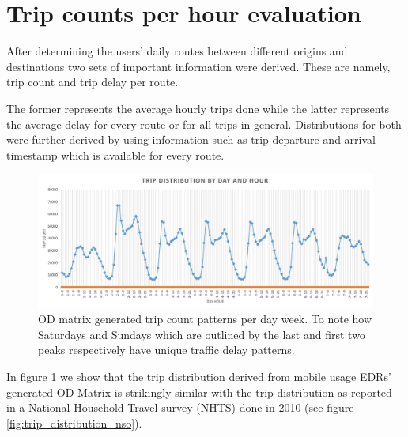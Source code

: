 \documentclass[12pt, a4paper]{report}
\theoremstyle{definition}
\theoremstyle{definition}%
\theoremstyle{definition}%
\theoremstyle{definition}%
\theoremstyle{definition}%
\theoremstyle{definition}%
\begin{document}

\section{Trip counts per hour evaluation}

After determining the users' daily routes between different origins and destinations two sets of important information were derived. These are namely, trip count and trip delay per route. 

The former represents the average hourly trips done while the latter represents the average delay for every route or for all trips in general. Distributions for both were further derived by using information such as trip departure and arrival timestamp which is available for every route. 

\begin{figure}[!]	
	\includegraphics[scale=0.5]{Trip_delay_per_day_week.jpg}
	\centering
	\caption[OD matrix generated trip count]{OD matrix generated trip count patterns per day week. To note how Saturdays and Sundays which are outlined by the last and first two peaks respectively have unique traffic delay patterns.}
	\label{fig:trip_distribution}
\end{figure}


In figure \ref{fig:trip_distribution} we show that the trip distribution derived from mobile usage EDRs' generated OD Matrix is strikingly similar with the trip distribution as reported in a National Household Travel survey (NHTS) done in 2010 \cite{malta2011national} (see figure \ref{fig:trip_distribution_nso}). 
\end{document}
